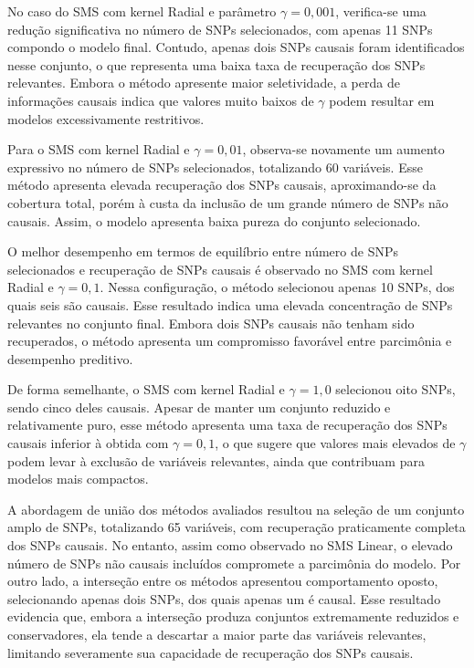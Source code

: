 \documentclass[12pt,a4paper]{article}
\begin{document}
No caso do SMS com kernel Radial e parâmetro $\gamma = 0{,}001$, verifica-se uma redução significativa no número de SNPs selecionados, com apenas 11 SNPs compondo o modelo final. Contudo, apenas dois SNPs causais foram identificados nesse conjunto, o que representa uma baixa taxa de recuperação dos SNPs relevantes. Embora o método apresente maior seletividade, a perda de informações causais indica que valores muito baixos de $\gamma$ podem resultar em modelos excessivamente restritivos.

Para o SMS com kernel Radial e $\gamma = 0{,}01$, observa-se novamente um aumento expressivo no número de SNPs selecionados, totalizando 60 variáveis. Esse método apresenta elevada recuperação dos SNPs causais, aproximando-se da cobertura total, porém à custa da inclusão de um grande número de SNPs não causais. Assim, o modelo apresenta baixa pureza do conjunto selecionado.

O melhor desempenho em termos de equilíbrio entre número de SNPs selecionados e recuperação de SNPs causais é observado no SMS com kernel Radial e $\gamma = 0{,}1$. Nessa configuração, o método selecionou apenas 10 SNPs, dos quais seis são causais. Esse resultado indica uma elevada concentração de SNPs relevantes no conjunto final. Embora dois SNPs causais não tenham sido recuperados, o método apresenta um compromisso favorável entre parcimônia e desempenho preditivo.

De forma semelhante, o SMS com kernel Radial e $\gamma = 1{,}0$ selecionou oito SNPs, sendo cinco deles causais. Apesar de manter um conjunto reduzido e relativamente puro, esse método apresenta uma taxa de recuperação dos SNPs causais inferior à obtida com $\gamma = 0{,}1$, o que sugere que valores mais elevados de $\gamma$ podem levar à exclusão de variáveis relevantes, ainda que contribuam para modelos mais compactos.

A abordagem de união dos métodos avaliados resultou na seleção de um conjunto amplo de SNPs, totalizando 65 variáveis, com recuperação praticamente completa dos SNPs causais. No entanto, assim como observado no SMS Linear, o elevado número de SNPs não causais incluídos compromete a parcimônia do modelo. Por outro lado, a interseção entre os métodos apresentou comportamento oposto, selecionando apenas dois SNPs, dos quais apenas um é causal. Esse resultado evidencia que, embora a interseção produza conjuntos extremamente reduzidos e conservadores, ela tende a descartar a maior parte das variáveis relevantes, limitando severamente sua capacidade de recuperação dos SNPs causais.
\end{document}
